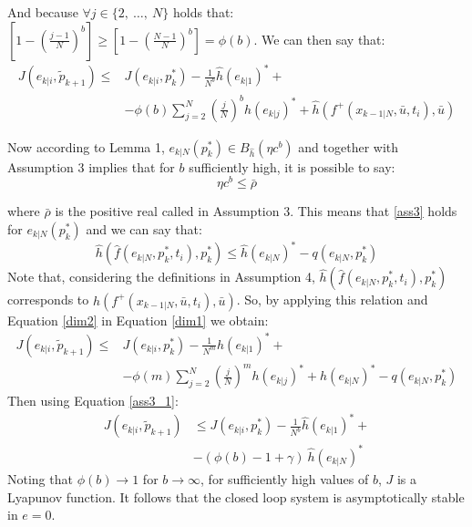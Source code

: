 And because $\forall j \in \lbrace2,\ \dots,\ N\rbrace$ holds that: 
$\left[ 1-\left(\frac{j-1}{N}\right)^b \right]\ge\left[ 1-\left(\frac{N-1}{N}\right)^b \right]= \phi(b)$. We can then say that: 
\begin{equation}\label{dim1}
    \begin{split}
        J({e}_{k|i},\tilde{p}_{k+1})\le &J({e}_{k|i},p_{k}^*) - \frac{1}{N^b}\hat{h}(e_{k|1})^*+ \\ 
        &-\phi(b)\sum_{j=2}^{N}\left(\frac{j}{N}\right)^b h(e_{k|j})^*+ \hat{h}\left(f^+(x_{k-1|N},\bar{u},t_i),\bar{u}\right)
    \end{split}
\end{equation}

Now according to Lemma 1, $e_{k|N}(p_k^*) \in B_{\hat{h}}(\eta c^b)$ and together with Assumption 3 implies that for $b$ sufficiently high, it is possible to say:
\begin{equation}
\eta c^b \leq \bar{\rho}
\end{equation}

where $\bar{\rho}$ is the positive real called in Assumption 3. This means that \ref{ass3} holds for $e_{k|N}(p_k^*)$ and we can say that:
\begin{equation}\label{dim2}
    \hat{h}(\hat{f}(e_{k|N},p_k^*,t_i),p_k^*) \le \hat{h}(e_{k|N})^*-q(e_{k|N},p_k^*)
\end{equation}
Note that, considering the definitions in Assumption 4, $\hat{h}(\hat{f}(e_{k|N},p_k^*,t_i),p_k^*)$ corresponds to $\hat{h}\left(f^+(x_{k-1|N},\bar{u},t_i),\bar{u}\right)$. So, by applying this relation and Equation \ref{dim2} in Equation \ref{dim1} we obtain: 
\begin{equation*}
    \begin{split}
        J({e}_{k|i},\tilde{p}_{k+1})\le &J({e}_{k|i},p_{k}^*) - \frac{1}{N^m}h(e_{k|1})^*+ \\ 
        &-\phi(m)\sum_{j=2}^{N}\left(\frac{j}{N}\right)^m h(e_{k|j})^*+ h(e_{k|N})^*-q(e_{k|N},p_k^*)
    \end{split}
\end{equation*}
Then using Equation \ref{ass3_1}:
\begin{equation*}
    \begin{split}
        J({e}_{k|i},\tilde{p}_{k+1})&\le J({e}_{k|i},p_{k}^*) - \frac{1}{N^b}\hat{h}(e_{k|1})^*+ \\ 
            &-(\phi(b)-1+\gamma)\ \hat{h}(e_{k|N})^*
    \end{split}
\end{equation*}
Noting that $\phi(b) \rightarrow 1$ for $b \rightarrow \infty$, for sufficiently high values of $b$, $J$ is a Lyapunov function. It follows that the closed loop system is asymptotically stable in $e=0$.

